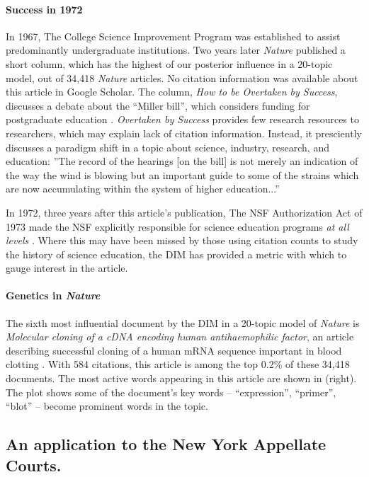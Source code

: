 \paragraph{Success in 1972}
In 1967, The College Science Improvement Program was established to
assist predominantly undergraduate institutions.  Two years later
\emph{Nature} published a short column, which has the highest of our
posterior influence in a 20-topic model, out of 34,418 \emph{Nature}
articles.  No citation information was available about this article in
Google Scholar. The column, \emph{How to be Overtaken by Success},
discusses a debate about the ``Miller bill'', which considers funding
for postgraduate education
\citep{Nature.success:1969}. \textit{Overtaken by Success} provides few
research resources to researchers, which may explain lack of citation
information. Instead, it presciently discusses a paradigm shift in a
topic about science, industry, research, and education: ''The record
of the hearings [on the bill] is not merely an indication of the way
the wind is blowing but an important guide to some of the strains
which are now accumulating within the system of higher education...''

In 1972, three years after this article's publication, The NSF
Authorization Act of 1973 made the NSF explicitly responsible for
science education programs \emph{at all levels}
\citep{NSF.website:2010}.  Where this may have been missed by those
using citation counts to study the history of science education, the
DIM has provided a metric with which to gauge interest in the article.


\paragraph{Genetics in \emph{Nature}}
The sixth most influential document by the DIM in a 20-topic model of
\emph{Nature} is \emph{Molecular cloning of a cDNA encoding human
  antihaemophilic factor}, an article describing successful
cloning of a human mRNA sequence important in blood clotting
\citep{toole:1984}.  With 584 citations, this article is among the top
0.2\% of these 34,418 documents.  The most active words
appearing in this article are shown in
 (right).  The plot shows some of the
document's key words -- ``expression'', ``primer'', ``blot'' -- become
prominent words in the topic.

\subsection{An application to the New York Appellate Courts.}

